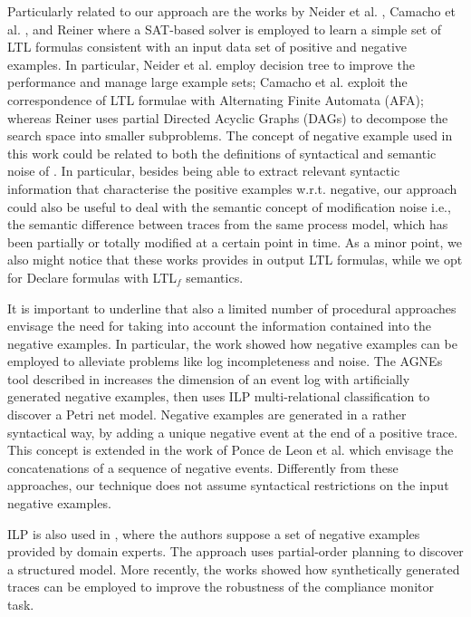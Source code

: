 \documentclass[a4wide,11pt]{article}
\theoremstyle{definition}
\theoremstyle{plain}
\begin{document}
Particularly related to our approach are the works by Neider et al. \cite{2018-Neider}, Camacho et al. \cite{2019-Camacho}, and Reiner \cite{2019-Riener} where a SAT-based solver is employed to learn a simple set of LTL formulas consistent with an input data set of positive and negative examples. In particular, Neider et al. \cite{2018-Neider} employ decision tree to improve the performance and manage large example sets; Camacho et al. \cite{2019-Camacho} exploit the correspondence of LTL formulae with Alternating Finite Automata (AFA); whereas Reiner uses partial Directed Acyclic Graphs (DAGs) to decompose the search space into smaller subproblems.
The concept of negative example used in this work could be related to both the definitions of syntactical and semantic noise of \cite{2009-Gunther}. In particular, besides being able to extract relevant syntactic information that characterise the positive examples w.r.t. negative, our approach could also be useful to deal with the semantic concept of modification noise i.e., the semantic difference between traces from the same process model, which has been partially or totally modified at a certain point in time.  As a minor point, we also might notice that these works provides in output LTL formulas, while we opt for Declare formulas with LTL$_f$ semantics.
 
It is important to underline that also a limited number of procedural approaches envisage the need for taking into account the information contained into the negative examples. 
In particular, the work \cite{2015-Ponce} showed how negative examples can be employed to alleviate problems like log incompleteness and noise.
The AGNEs tool described in \cite{2009-Goedertier} increases the dimension of an event log with artificially generated negative examples, then uses \ac{ILP} multi-relational classification to discover a Petri net model. 
Negative examples are generated in a rather syntactical way, by adding a unique negative event at the end of a positive trace. This concept is extended in the work of Ponce de Leon et al. \cite{2018-Ponce} which envisage the concatenations of a sequence of negative events. Differently from these approaches, our technique does not assume syntactical restrictions on the input negative examples.

\ac{ILP} is also used in \cite{2006-Ferreira}, where the authors suppose a set of negative examples provided by domain experts. The approach uses partial-order planning to discover a structured model. More recently, the works \cite{2014-Broucke,2014-BrouckePhD} showed how synthetically generated traces can be employed to improve the robustness of the compliance monitor task. 
 
\end{document}
